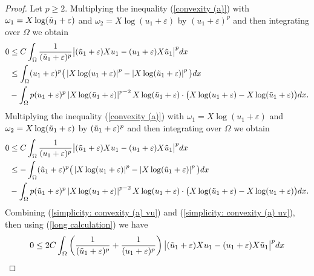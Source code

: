 \documentclass[a4paper,12pt,reqno]{amsart}
\renewcommand\eqref[1]{(\ref{#1})} %
\numberwithin{equation}{section}
\theoremstyle{plain}
\theoremstyle{definition}
\begin{document}
\begin{proof}
Let $p\geq 2$.  Multiplying the inequality \eqref{convexity (a)} with $\omega_{1}=X \log (\Tilde{u}_{1}+\varepsilon)$ and $\omega_{2}=X \log (u_{1}+\varepsilon)$ by $(u_{1}+\varepsilon)^p$ and then integrating over $\Omega$ we obtain
\begin{equation}\label{simplicity: convexity (a) vu}
\begin{aligned}
0  &\leq C \int_{\Omega}\frac{1}{(\Tilde{u}_{1}+\varepsilon)^{p}}\big|(\Tilde{u}_{1}+\varepsilon) X u_{1}-(u_{1}+\varepsilon) X \Tilde{u}_{1}\big|^{p} d x \\
& \leq \int_{\Omega}(u_{1}+\varepsilon)^{p}\big(\left|X \log (u_{1}+\varepsilon)\right|^{p}-\left|X \log (\Tilde{u}_{1}+\varepsilon)\right|^{p}\big) d x\\
&-\int_{\Omega} p (u_{1}+\varepsilon)^{p}\left|X \log (\Tilde{u}_{1}+\varepsilon)\right|^{p-2} X \log (\Tilde{u}_{1}+\varepsilon) \cdot\big(X \log (u_{1}+\varepsilon)-X \log (\Tilde{u}_{1}+\varepsilon)\big) d x.
\end{aligned}
\end{equation}
Multiplying the inequality \eqref{convexity (a)} with $\omega_{1}=X \log (u_{1}+\varepsilon)$ and $\omega_{2}=X \log (\Tilde{u}_{1}+\varepsilon)$ by $(\Tilde{u}_{1}+\varepsilon)^p$ and then integrating over $\Omega$ we obtain
\begin{equation}\label{simplicity: convexity (a) uv}
\begin{aligned}
0 & \leq C \int_{\Omega}\frac{1}{(u_{1}+\varepsilon)^{p}}\big|(\Tilde{u}_{1}+\varepsilon) X u_{1}-(u_{1}+\varepsilon) X \Tilde{u}_{1}\big|^{p} d x \\
& \leq-\int_{\Omega}(\Tilde{u}_{1}+\varepsilon)^{p}\big(\left|X \log (u_{1}+\varepsilon)\right|^{p}-\left|X \log (\Tilde{u}_{1}+\varepsilon)\right|^{p}\big) d x\\
& -\int_{\Omega} p (\Tilde{u}_{1}+\varepsilon)^{p}\left|X \log (u_{1}+\varepsilon)\right|^{p-2} X \log (u_{1}+\varepsilon) \cdot\big(X \log (\Tilde{u}_{1}+\varepsilon)-X \log (u_{1}+\varepsilon)\big) d x.
\end{aligned}   
\end{equation}
Combining \eqref{simplicity: convexity (a) vu} and \eqref{simplicity: convexity (a) uv}, then using \eqref{long calculation} we have
\begin{equation*}
\begin{aligned}
&0  \leq 2C \int_{\Omega}\left(\frac{1}{(\Tilde{u}_{1}+\varepsilon)^{p}}+\frac{1}{(u_{1}+\varepsilon)^{p}}\right)\big|(\Tilde{u}_{1}+\varepsilon) X u_{1}-(u_{1}+\varepsilon) X \Tilde{u}_{1}\big|^{p} d x \\

\end{aligned}
\end{equation*}
\end{proof}
\end{document}
